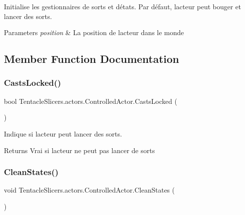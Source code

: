 Initialise les gestionnaires de sorts et d\textquotesingle{}états. Par défaut, l\textquotesingle{}acteur peut bouger et lancer des sorts. 


\begin{DoxyParams}{Parameters}
{\em position} & La position de l\textquotesingle{}acteur dans le monde \\
\hline
\end{DoxyParams}


\subsection{Member Function Documentation}
\mbox{\label{class_tentacle_slicers_1_1actors_1_1_controlled_actor_a0b22d71ca852533f95c02bb214de6567}} 
\subsubsection{\texorpdfstring{Casts\+Locked()}{CastsLocked()}}
{\footnotesize\ttfamily bool Tentacle\+Slicers.\+actors.\+Controlled\+Actor.\+Casts\+Locked (\begin{DoxyParamCaption}{ }\end{DoxyParamCaption})}



Indique si l\textquotesingle{}acteur peut lancer des sorts. 

\begin{DoxyReturn}{Returns}
Vrai si l\textquotesingle{}acteur ne peut pas lancer de sorts 
\end{DoxyReturn}
\mbox{\label{class_tentacle_slicers_1_1actors_1_1_controlled_actor_ae47a0e6c043c7ad9f3baa49e46fda3c2}} 
\subsubsection{\texorpdfstring{Clean\+States()}{CleanStates()}}
{\footnotesize\ttfamily void Tentacle\+Slicers.\+actors.\+Controlled\+Actor.\+Clean\+States (\begin{DoxyParamCaption}{ }\end{DoxyParamCaption})}



